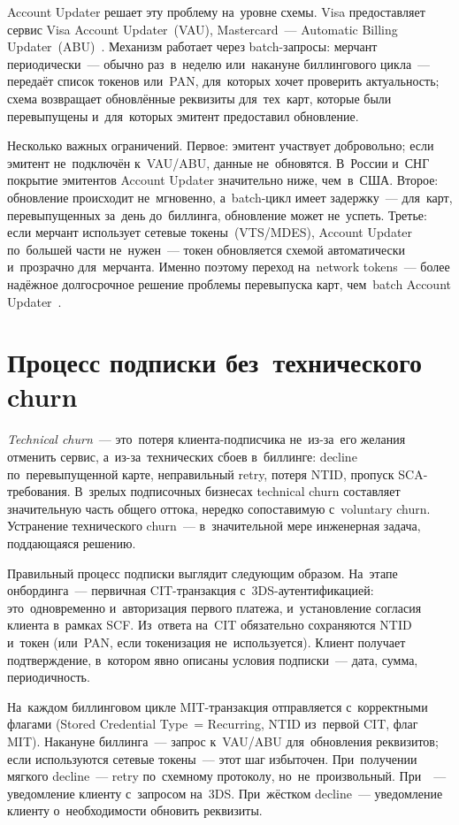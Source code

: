 Account Updater решает эту проблему на~уровне схемы. Visa предоставляет
сервис Visa Account Updater~(VAU), Mastercard~---
Automatic Billing Updater~(ABU)~.
Механизм работает через batch-запросы: мерчант периодически~--- обычно
раз~в~неделю или~накануне биллингового цикла~--- передаёт список токенов
или~PAN, для~которых хочет проверить актуальность; схема возвращает
обновлённые реквизиты для~тех~карт, которые были перевыпущены и~для~которых
эмитент предоставил обновление.

Несколько важных ограничений. Первое: эмитент участвует добровольно;
если эмитент не~подключён к~VAU/ABU, данные не~обновятся. В~России
и~СНГ покрытие эмитентов Account Updater значительно ниже, чем~в~США.
Второе: обновление происходит не~мгновенно, а~batch-цикл имеет задержку~---
для~карт, перевыпущенных за~день до~биллинга, обновление может не~успеть.
Третье: если мерчант использует сетевые токены~(VTS/MDES), Account Updater
по~большей части не~нужен~--- токен обновляется схемой автоматически
и~прозрачно для~мерчанта. Именно поэтому переход на~network tokens~---
более надёжное долгосрочное решение проблемы перевыпуска карт,
чем~batch Account Updater~.


\section{Процесс подписки без~технического churn}
\label{sec:subscriptions-anti-churn}

\textit{Technical churn}~--- это~потеря клиента-подписчика не~из-за~его
желания отменить сервис, а~из-за~технических сбоев в~биллинге: decline
по~перевыпущенной карте, неправильный retry, потеря NTID, пропуск
SCA-требования. В~зрелых подписочных бизнесах technical churn составляет
значительную часть общего оттока, нередко сопоставимую с~voluntary churn.
Устранение технического churn~--- в~значительной мере инженерная задача,
поддающаяся решению.

Правильный процесс подписки выглядит следующим образом. На~этапе онбординга~---
первичная CIT-транзакция с~3DS-аутентификацией: это~одновременно
и~авторизация первого платежа, и~установление согласия клиента в~рамках
SCF. Из~ответа на~CIT обязательно сохраняются NTID и~токен (или~PAN,
если токенизация не~используется). Клиент получает подтверждение,
в~котором явно описаны условия подписки~--- дата, сумма, периодичность.

На~каждом биллинговом цикле MIT-транзакция отправляется с~корректными
флагами (Stored Credential Type~= Recurring, NTID из~первой CIT, флаг
MIT). Накануне биллинга~--- запрос к~VAU/ABU для~обновления реквизитов;
если используются сетевые токены~--- этот шаг избыточен. При~получении
мягкого decline~--- retry по~схемному протоколу, но~не~произвольный.
При~~--- уведомление клиенту с~запросом на~3DS. При~жёстком
decline~--- уведомление клиенту о~необходимости обновить реквизиты.


